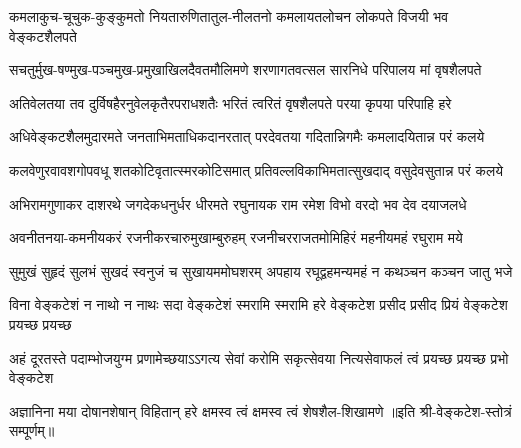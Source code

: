 
\twolineshloka
{कमलाकुच-चूचुक-कुङ्कुमतो नियतारुणितातुल-नीलतनो}
{कमलायतलोचन लोकपते विजयी भव वेङ्कटशैलपते}

\twolineshloka
{सचतुर्मुख-षण्मुख-पञ्चमुख-प्रमुखाखिलदैवतमौलिमणे}
{शरणागतवत्सल सारनिधे परिपालय मां वृषशैलपते}

\twolineshloka
{अतिवेलतया तव दुर्विषहैरनुवेलकृतैरपराधशतैः}
{भरितं त्वरितं वृषशैलपते परया कृपया परिपाहि हरे}

\twolineshloka
{अधिवेङ्कटशैलमुदारमते जनताभिमताधिकदानरतात्}
{परदेवतया गदितान्निगमैः कमलादयितान्न परं कलये}

\twolineshloka
{कलवेणुरवावशगोपवधू शतकोटिवृतात्स्मरकोटिसमात्}
{प्रतिवल्लविकाभिमतात्सुखदाद् वसुदेवसुतान्न परं कलये}

\twolineshloka
{अभिरामगुणाकर दाशरथे जगदेकधनुर्धर धीरमते}
{रघुनायक राम रमेश विभो वरदो भव देव दयाजलधे}

\twolineshloka
{अवनीतनया-कमनीयकरं रजनीकरचारुमुखाम्बुरुहम्}
{रजनीचरराजतमोमिहिरं महनीयमहं रघुराम मये}

\twolineshloka
{सुमुखं सुहृदं सुलभं सुखदं स्वनुजं च सुखायममोघशरम्}
{अपहाय रघूद्वहमन्यमहं न कथञ्चन कञ्चन जातु भजे}

\fourlineindentedshloka
{विना वेङ्कटेशं न नाथो न नाथः}
{सदा वेङ्कटेशं स्मरामि स्मरामि}
{हरे वेङ्कटेश प्रसीद प्रसीद}
{प्रियं वेङ्कटेश प्रयच्छ प्रयच्छ}%

\fourlineindentedshloka
{अहं दूरतस्ते पदाम्भोजयुग्म}
{प्रणामेच्छयाऽऽगत्य सेवां करोमि}
{सकृत्सेवया नित्यसेवाफलं त्वं}
{प्रयच्छ प्रयच्छ प्रभो वेङ्कटेश}

\twolineshloka
{अज्ञानिना मया दोषानशेषान् विहितान् हरे}
{क्षमस्व त्वं क्षमस्व त्वं शेषशैल-शिखामणे}
॥इति श्री-वेङ्कटेश-स्तोत्रं सम्पूर्णम्॥
